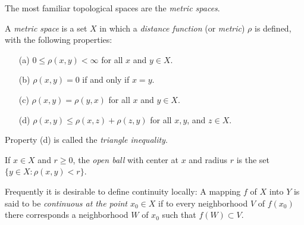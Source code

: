 \documentclass[a4paper,12pt,twoside,openany]{book}
\begin{document}

The most familiar topological spaces are the \textit{metric spaces}.

A \textit{metric space} is a set $X$ in which a \textit{distance function} (or \textit{metric}) $\rho$ is defined, with the following properties:
\begin{itemize}
    \item[(a)] $0\le\rho(x,y)<\infty$ for all $x$ and $y\in X$.
    \item[(b)] $\rho(x,y)=0$ if and only if $x=y$.
    \item[(c)] $\rho(x,y)=\rho(y,x)$ for all $x$ and $y\in X$.
    \item[(d)] $\rho(x,y)\le\rho(x,z)+\rho(z,y)$ for all $x,y$, and $z\in X$.
\end{itemize}

Property (d) is called the \textit{triangle inequality}.

If $x\in X$ and $r\ge 0$, the \textit{open ball} with center at $x$ and radius $r$ is the set $\{y\in X:\rho(x,y)<r\}$.

Frequently it is desirable to define continuity locally: A mapping $f$ of $X$ into $Y$ is said to be \textit{continuous at the point $x_0\in X$} if to every neighborhood $V$ of $f(x_0)$ there corresponds a neighborhood $W$ of $x_0$ such that $f(W)\subset V$.
\end{document}
